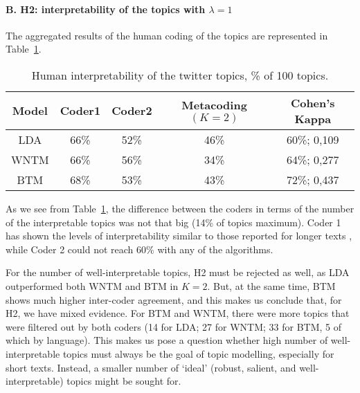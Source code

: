 \paragraph{B. H2: interpretability of the topics with \(\lambda = 1\)}
The aggregated results of the human coding of the topics are represented in Table~\cref{tab:topicHumanInterpretability}.

\begin{table}[ht]%
	\centering
	\caption{Human interpretability of the twitter topics, \% of 100 topics.}%
	\label{tab:topicHumanInterpretability}%
		\begin{tabular}{ c  c  c  c  c }%
			\toprule
			Model & Coder1 & Coder2 & Metacoding \((K = 2)\) &  Cohen’s Kappa \\
			\hline
			LDA & 66\% & 52\% & 46\% & 60\%; 0,109 \\
			WNTM & 66\% & 56\% & 34\% & 64\%; 0,277 \\
			BTM & 68\% & 53\% & 43\% & 72\%; 0,437 \\
			\bottomrule
		\end{tabular}%
\end{table}

As we see from Table~\cref{tab:topicHumanInterpretability}, the difference between the coders in terms of the number of the interpretable topics was not that big (14\% of topics maximum). Coder 1 has shown the levels of interpretability similar to those reported for longer texts \cite{KoltsovaKoltcov}, while Coder 2 could not reach 60\% with any of the algorithms.

For the number of well-interpretable topics, H2 must be rejected as well, as LDA outperformed both WNTM and BTM in \(K = 2\). But, at the same time, BTM shows much higher inter-coder agreement, and this makes us conclude that, for H2, we have mixed evidence. For BTM and WNTM, there were more topics that were filtered out by both coders (14 for LDA; 27 for WNTM; 33 for BTM, 5 of which by language). This makes us pose a question whether high number of well-interpretable topics must always be the goal of topic modelling, especially for short texts. Instead, a smaller number of ‘ideal’ (robust, salient, and well- interpretable) topics might be sought for.

